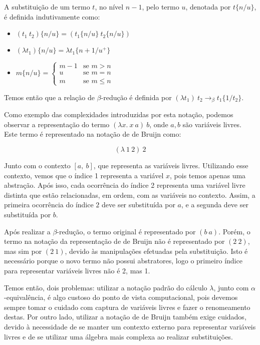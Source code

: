 \begin{definicao} A substituição de um termo $t$, no nível $n -
    1$, pelo termo $u$,
    denotada por $t\{n/u\}$, é definida indutivamente como:
    \begin{itemize}
        \item $(t_1\ t_2)\{n/u\} = (t_1\{n/u\}\ t_2\{n/u\})$
        \item $(\lambda t_1)\{n/u\} = \lambda t_1\{n+1/u^+\}$
        \item $m\{n/u\} = \begin{cases}
                             m - 1 & \text{se } m > n \\
                             u     & \text{se } m = n \\
                             m     & \text{se } m \leq n
                          \end{cases}$
    \end{itemize}
\end{definicao}


\smallskip
Temos então que a relação de $\beta$-redução é definida por $(\lambda t_1)\ t_2
\rightarrow_{\beta} t_1\{1/t_2\}$.
\smallskip

Como exemplo das complexidades introduzidas por esta notação, podemos observar a
representação do termo $(\lambda x.\ x\ a)\ b$, onde $a,b$ são
variáveis livres. Este termo é representado na notação de de Bruijn como:

\[ (\lambda\ 1\ 2)\ 2 \]

Junto com o contexto $[a,\ b]$, que representa as variáveis livres.  Utilizando
esse contexto, vemos que o índice 1 representa a variável $x$, pois temos apenas
uma abstração. Após isso, cada ocorrência do índice 2 representa uma variável
livre distinta que estão relacionadas, em ordem, com as variáveis no contexto.
Assim, a primeira ocorrência do índice $2$ deve ser substituída por $a$, e a
segunda deve ser substituída por $b$.

Após realizar a $\beta$-redução, o termo original é representado por $(b\ a)$.
Porém, o termo na notação da representação de de Bruijn não é representado por
$(2\ 2)$, mas sim por $(2\ 1)$, devido às manipulações efetuadas pela
substituição. Isto é necessário porque o novo termo não possui abstratores, logo
o primeiro índice para representar variáveis livres não é 2, mas 1.

Temos então, dois problemas: utilizar a notação padrão do cálculo $\lambda$,
junto com $\alpha$-equivalência, é algo custoso do ponto de vista computacional,
pois devemos sempre tomar o cuidado com captura de variáveis livres e fazer o
renomeamento destas. Por outro lado, utilizar a notação de de Bruijn também
exige cuidados, devido à necessidade de se manter um contexto externo para
representar variáveis livres e de se utilizar uma álgebra mais complexa ao
realizar substituições.


